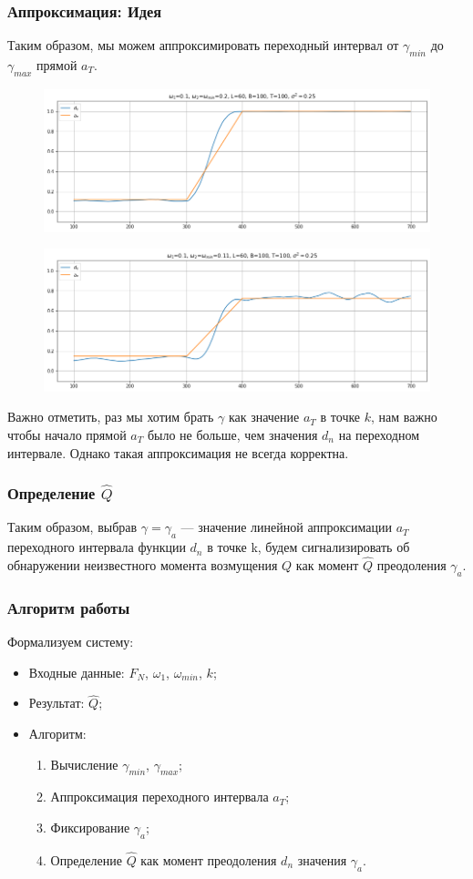 \documentclass[11pt]{beamer}
\begin{document}
	\begin{frame}
		\frametitle{Аппроксимация: Идея}
		Таким образом, мы можем аппроксимировать переходный интервал от $ \gamma_{min} $ до $ \gamma_{max} $ прямой $ a_T $. 
		\begin{figure}[b]
			\centering
			\includegraphics[width=0.6\linewidth]{imgs/row_linear_approximation_1}
		\end{figure}
		
		\begin{figure}[b]
			\centering
			\includegraphics[width=0.6\linewidth]{imgs/row_linear_approximation_2}
		\end{figure}
		\small
		Важно отметить, раз мы хотим брать $ \gamma $ как значение $ a_T $ в точке $ k $, нам важно чтобы начало прямой $ a_T $ было не больше, чем значения $ d_n $ на переходном интервале. Однако такая аппроксимация не всегда корректна.
	\end{frame}
	
	\begin{frame}
		\frametitle{Определение $ \hat{Q} $}
		Таким образом, выбрав $ \gamma = \gamma_a $ --- значение линейной аппроксимации $ a_T $ переходного интервала функции $ d_n $ в точке k, будем сигнализировать об обнаружении неизвестного момента возмущения $ Q $ как момент $ \hat{Q} $ преодоления $ \gamma_a $.
	\end{frame}

	\begin{frame}
		\frametitle{Алгоритм работы}
		Формализуем систему:
		\begin{itemize}
			\item Входные данные: $ F_N $, $\omega_1$, $\omega_{min}$, $ k $;
			\item Результат: $\hat{Q}$;
			\item Алгоритм:
			\begin{enumerate}
				\item Вычисление $ \gamma_{min} $, $ \gamma_{max} $;
				\item Аппроксимация переходного интервала $ a_T $;
				\item Фиксирование $ \gamma_a $;
				\item Определение $ \hat{Q} $ как момент преодоления $ d_n $ значения $ \gamma_a $.
			\end{enumerate}	
		\end{itemize}		
	\end{frame}
	
\end{document}
